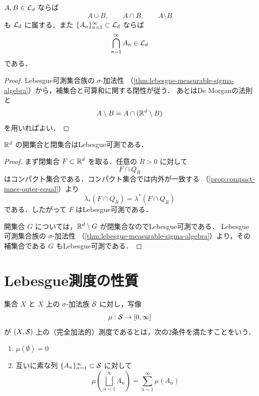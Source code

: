 \begin{corollary}[集合演算]\label{cor:lebesgue-measurable-set-operations}
$A,B\in\mathcal L_d$ ならば
\[
A\cup B,\qquad A\cap B,\qquad A\setminus B
\]
も $\mathcal L_d$ に属する．また $\{A_n\}_{n=1}^{\infty}\subset\mathcal L_d$ ならば
\[
\bigcap_{n=1}^{\infty}A_n\in\mathcal L_d
\]
である．
\end{corollary}
\begin{proof}
Lebesgue可測集合族の $\sigma$-加法性
（\cref{thm:lebesgue-measurable-sigma-algebra}）から，補集合と可算和に関する閉性が従う．
あとはDe Morganの法則と
\[
A\setminus B=A\cap(\mathbb R^d\setminus B)
\]
を用いればよい．
\end{proof}

\begin{theorem}[開集合と閉集合]\label{thm:open-closed-lebesgue-measurable}
$\mathbb R^d$ の開集合と閉集合はLebesgue可測である．
\end{theorem}
\begin{proof}
まず閉集合 $F\subset\mathbb R^d$ を取る．任意の $R>0$ に対して
\[
F\cap Q_R
\]
はコンパクト集合である．コンパクト集合では内外が一致する
（\cref{prop:compact-inner-outer-equal}）より
\[
\lambda_*(F\cap Q_R)=\lambda^*(F\cap Q_R)
\]
である．したがって $F$ はLebesgue可測である．

開集合 $G$ については，$\mathbb R^d\setminus G$ が閉集合なのでLebesgue可測である．
Lebesgue可測集合族の $\sigma$-加法性
（\cref{thm:lebesgue-measurable-sigma-algebra}）より，その補集合である $G$ もLebesgue可測である．
\end{proof}

\section{Lebesgue測度の性質} \label{sec:lebesgue-measure-properties}

\begin{definition}[完全加法的測度]\label{def:countably-additive-measure}
集合 $X$ と $X$ 上の $\sigma$-加法族 $\mathcal S$ に対し，写像
\[
\mu:\mathcal S\to[0,\infty]
\]
が $(X,\mathcal S)$ 上の（完全加法的）測度であるとは，次の2条件を満たすことをいう．
\begin{enumerate}
    \item $\mu(\emptyset)=0$
    \item 互いに素な列 $\{A_n\}_{n=1}^{\infty}\subset\mathcal S$ に対して
    \[
    \mu\left(\bigsqcup_{n=1}^{\infty}A_n\right)
    =
    \sum_{n=1}^{\infty}\mu(A_n)
    \]
\end{enumerate}
\end{definition}

